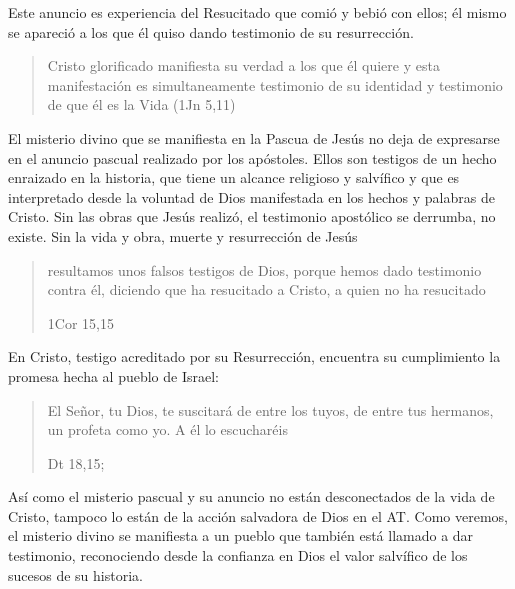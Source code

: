 Este anuncio es experiencia del Resucitado que comió y bebió con ellos; él mismo
se apareció a los que él quiso dando testimonio de su resurrección.
\blockquote[{\cite[129]{prades2015testimonio}}]{Cristo glorificado manifiesta su
  verdad a los que él quiere y esta manifestación es simultaneamente testimonio
  de su identidad y testimonio de que él es la Vida (1Jn 5,11)}

El misterio divino que se manifiesta en la Pascua de Jesús no deja de expresarse
en el anuncio pascual realizado por los apóstoles. Ellos son testigos de un
hecho enraizado en la historia, que tiene un alcance religioso y salvífico y que
es interpretado desde la voluntad de Dios manifestada en los hechos y palabras
de Cristo. Sin las obras que Jesús realizó, el testimonio apostólico se
derrumba, no existe.\autocite[Cf.][1529]{latourelle2000testimonio} Sin la vida y
obra, muerte y resurrección de Jesús \blockquote[1Cor 15,15]{resultamos unos
  falsos testigos de Dios, porque hemos dado testimonio contra él, diciendo que
  ha resucitado a Cristo, a quien no ha resucitado}.

En Cristo, testigo acreditado por su Resurrección, encuentra su cumplimiento la
promesa hecha al pueblo de Israel: \blockquote[Dt 18,15;
{\cite[Cf.~][24ss]{ratzinger2007jdenaz}}]{El Señor, tu Dios, te suscitará de
  entre los tuyos, de entre tus hermanos, un profeta como yo. A él lo
  escucharéis}. Así como el misterio pascual y su anuncio no están desconectados
de la vida de Cristo, tampoco lo están de la acción salvadora de Dios en el AT.
Como veremos, el misterio divino se manifiesta a un pueblo que también está
llamado a dar testimonio, reconociendo desde la confianza en Dios el valor
salvífico de los sucesos de su historia.
